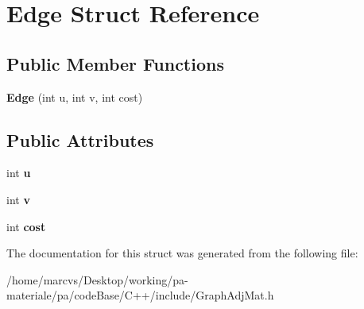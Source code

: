 \hypertarget{structEdge}{
\section{Edge Struct Reference}
\label{structEdge}
}
\subsection*{Public Member Functions}
\begin{DoxyCompactItemize}
\item 
\hypertarget{structEdge_a22f1e1ca49a024d90059cd05b94b3dc2}{
{\bfseries Edge} (int u, int v, int cost)}
\label{structEdge_a22f1e1ca49a024d90059cd05b94b3dc2}

\end{DoxyCompactItemize}
\subsection*{Public Attributes}
\begin{DoxyCompactItemize}
\item 
\hypertarget{structEdge_a60a34279415f9bff8844f0c0a8675ae3}{
int {\bfseries u}}
\label{structEdge_a60a34279415f9bff8844f0c0a8675ae3}

\item 
\hypertarget{structEdge_aac59de4b133921591182667a1e656e18}{
int {\bfseries v}}
\label{structEdge_aac59de4b133921591182667a1e656e18}

\item 
\hypertarget{structEdge_ad7099a9059c497bb6d6191b6257837cf}{
int {\bfseries cost}}
\label{structEdge_ad7099a9059c497bb6d6191b6257837cf}

\end{DoxyCompactItemize}


The documentation for this struct was generated from the following file:\begin{DoxyCompactItemize}
\item 
/home/marcvs/Desktop/working/pa-\/materiale/pa/codeBase/C++/include/GraphAdjMat.h\end{DoxyCompactItemize}
